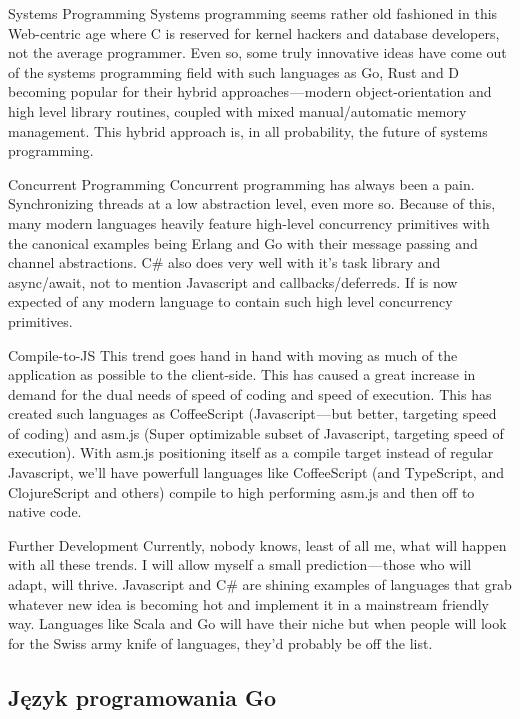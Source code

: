 Systems Programming
Systems programming seems rather old fashioned in this Web-centric age where C is reserved for kernel hackers and database developers, not the average programmer. Even so, some truly innovative ideas have come out of the systems programming field with such languages as Go, Rust and D becoming popular for their hybrid approaches — modern object-orientation and high level library routines, coupled with mixed manual/automatic memory management. This hybrid approach is, in all probability, the future of systems programming.

Concurrent Programming
Concurrent programming has always been a pain. Synchronizing threads at a low abstraction level, even more so. Because of this, many modern languages heavily feature high-level concurrency primitives with the canonical examples being Erlang and Go with their message passing and channel abstractions. C# also does very well with it’s task library and async/await, not to mention Javascript and callbacks/deferreds. If is now expected of any modern language to contain such high level concurrency primitives.

Compile-to-JS
This trend goes hand in hand with moving as much of the application as possible to the client-side. This has caused a great increase in demand for the dual needs of speed of coding and speed of execution. This has created such languages as CoffeeScript (Javascript — but better, targeting speed of coding) and asm.js (Super optimizable subset of Javascript, targeting speed of execution). With asm.js positioning itself as a compile target instead of regular Javascript, we’ll have powerfull languages like CoffeeScript (and TypeScript, and ClojureScript and others) compile to high performing asm.js and then off to native code.

Further Development
Currently, nobody knows, least of all me, what will happen with all these trends. I will allow myself a small prediction — those who will adapt, will thrive. Javascript and C# are shining examples of languages that grab whatever new idea is becoming hot and implement it in a mainstream friendly way. Languages like Scala and Go will have their niche but when people will look for the Swiss army knife of languages, they’d probably be off the list.


\subsection{Język programowania Go} %
\label{sss_go}


